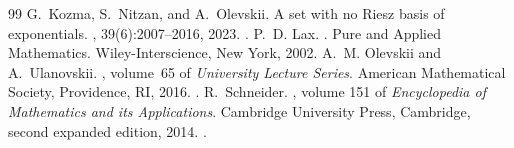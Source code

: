 \documentclass[10pt,a4paper]{amsart}
\newcommand\1{\mathbbm{1}}
\begin{document}
\begin{thebibliography}{99}
 G.~Kozma, S.~Nitzan, and A.~Olevskii. \newblock A set with no {Riesz} basis of exponentials. , 39(6):2007--2016, 2023. \newblock \href {https://doi.org/10.4171/RMI/1411} {}.
 P.~D. Lax. . \newblock Pure and Applied Mathematics. Wiley-Interscience, New York, 2002.
 A.~M. Olevskii and A.~Ulanovskii. , volume~65 of {\em University Lecture Series}. \newblock American Mathematical Society, Providence, RI, 2016. \newblock \href {https://doi.org/10.1090/ulect/065} {}.
 R.~Schneider. , volume 151 of {\em Encyclopedia of Mathematics and its Applications}. \newblock Cambridge University Press, Cambridge, second expanded edition, 2014. \newblock \href {https://doi.org/10.1017/CBO9781139003858} {}.
\end{thebibliography}
\end{document}
